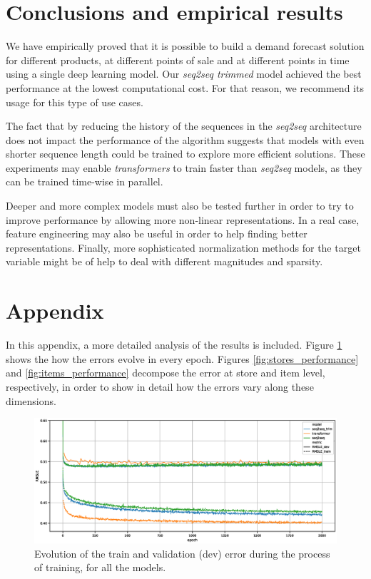 \documentclass{elsarticle}
\begin{document}
	\section{Conclusions and empirical results}
	We have empirically proved that it is possible to build a demand forecast solution for different products, at different points of sale and at different points in time using a single deep learning model. Our \textit{seq2seq trimmed} model achieved the best performance at the lowest computational cost. For that reason, we recommend its usage for this type of use cases.
	
	The fact that by reducing the history of the sequences in the \textit{seq2seq} architecture does not impact the performance of the algorithm suggests that models with even shorter sequence length could be trained to explore more efficient solutions. These experiments may enable \textit{transformers} to train faster than \textit{seq2seq} models, as they can be trained time-wise in parallel.  
	
	Deeper and more complex models must also be tested further in order to try to improve performance by allowing more non-linear representations. In a real case, feature engineering may also be useful in order to help finding better representations. Finally, more sophisticated normalization methods for the target variable might be of help to deal with different magnitudes and sparsity.
	
	\newpage
	
	
	
	
	\newpage
	\section*{Appendix}
	In this appendix, a more detailed analysis of the results is included. Figure \ref{fig:performance_evolution} shows the how the errors evolve in every epoch. Figures \ref{fig:stores_performance} and \ref{fig:items_performance} decompose the error at store and item level, respectively, in order to show in detail how the errors vary along these dimensions.
	
	\begin{figure}[h!]
		\centering
		\includegraphics[width=1\linewidth]{img/evolution}
		\caption{Evolution of the train and validation (dev) error during the process of training, for all the models.}
		\label{fig:performance_evolution}
	\end{figure}
	
\end{document}
